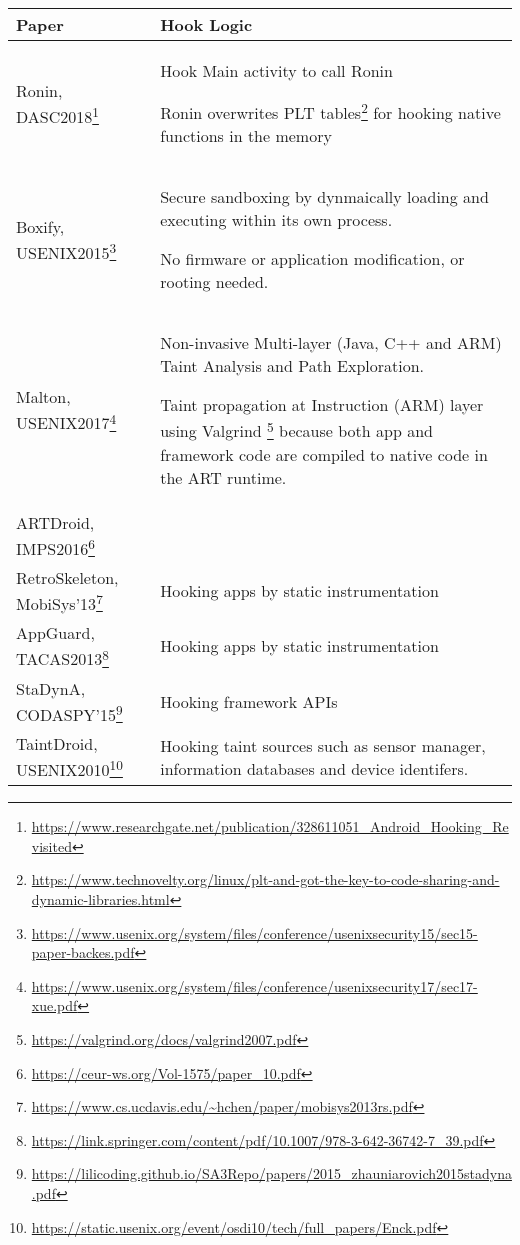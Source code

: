 \begin{longtable}{p{.3\linewidth}p{.7\linewidth}} 
\toprule
Paper & Hook Logic  \\
\midrule
\endhead
Ronin, DASC2018\footnote{\url{https://www.researchgate.net/publication/328611051_Android_Hooking_Revisited}}
&Hook Main activity to call Ronin

Ronin overwrites PLT tables\footnote{\url{https://www.technovelty.org/linux/plt-and-got-the-key-to-code-sharing-and-dynamic-libraries.html}}  for hooking native functions in the memory
\\

Boxify, USENIX2015\footnote{\url{https://www.usenix.org/system/files/conference/usenixsecurity15/sec15-paper-backes.pdf}}
& Secure sandboxing by dynmaically loading and executing within its own process.

No firmware or application modification, or rooting needed.
\\

Malton, USENIX2017\footnote{\url{https://www.usenix.org/system/files/conference/usenixsecurity17/sec17-xue.pdf}}
& Non-invasive Multi-layer (Java, C++ and ARM) Taint Analysis and Path Exploration. 

Taint propagation at Instruction (ARM) layer using Valgrind \footnote{\url{https://valgrind.org/docs/valgrind2007.pdf}} because both app and framework code are compiled to native code in the ART runtime.
\\

ARTDroid, IMPS2016\footnote{\url{https://ceur-ws.org/Vol-1575/paper_10.pdf}}
&
\\

RetroSkeleton, MobiSys'13\footnote{\url{https://www.cs.ucdavis.edu/~hchen/paper/mobisys2013rs.pdf}}
& Hooking apps by static instrumentation
\\

AppGuard, TACAS2013\footnote{\url{https://link.springer.com/content/pdf/10.1007/978-3-642-36742-7_39.pdf}}
& Hooking apps by static instrumentation
\\

StaDynA, CODASPY'15\footnote{\url{https://lilicoding.github.io/SA3Repo/papers/2015_zhauniarovich2015stadyna.pdf}}
& Hooking framework APIs
\\

TaintDroid, USENIX2010\footnote{\url{https://static.usenix.org/event/osdi10/tech/full_papers/Enck.pdf}}
&Hooking taint sources such as sensor manager, information databases and device identifers.


\end{longtable}
